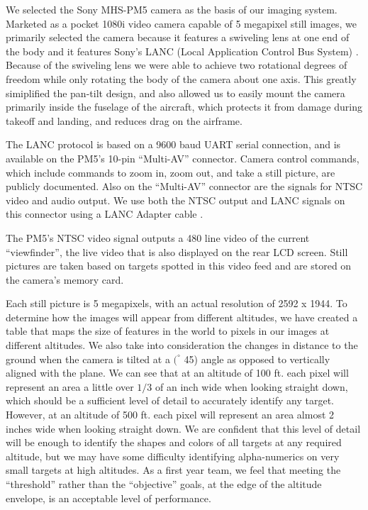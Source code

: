 \documentclass[10pt]{report}
\newcommand{\degrees}[1]
{
\begin{math}
#1^{\circ} 
\end{math}
}
\begin{document}
We selected the Sony MHS-PM5 camera as the basis of our imaging system. Marketed as a pocket 1080i video camera capable of 5 megapixel still images, we primarily selected the camera because it features a swiveling lens at one end of the body and it features Sony's LANC (Local Application Control Bus System) \cite{lanc}. Because of the swiveling lens we were able to achieve two rotational degrees of freedom while only rotating the body of the camera about one axis.  This greatly simiplified the pan-tilt design, and also allowed us to easily mount the camera primarily inside the fuselage of the aircraft, which protects it from damage during takeoff and landing, and reduces drag on the airframe. 

The LANC protocol is based on a 9600 baud UART serial connection, and is available on the PM5's 10-pin ``Multi-AV'' connector. Camera control commands, which include commands to zoom in, zoom out, and take a still picture, are publicly documented.  Also on the ``Multi-AV'' connector are the signals for NTSC video and audio output. We use both the NTSC output and LANC signals on this connector using a LANC Adapter cable \cite{lanc_adapter}.

The PM5's NTSC video signal outputs a 480 line video of the current ``viewfinder'', the live video that is also displayed on the rear LCD screen.  Still pictures are taken based on targets spotted in this video feed and are stored on the camera's memory card.

Each still picture is 5 megapixels, with an actual resolution of 2592 x 1944.  To determine how the images will appear from different altitudes, we have created a table that maps the size of features in the world to pixels in our images at different altitudes.  We also take into consideration the changes in distance to the ground when the camera is tilted at a \degrees(45) angle as opposed to vertically aligned with the plane.  We can see that at an altitude of 100 ft. each pixel will represent an area a little over $1/3$ of an inch wide when looking straight down, which should be a sufficient level of detail to accurately identify any target.  However, at an altitude of 500 ft. each pixel will represent an area almost 2 inches wide when looking straight down.  We are confident that this level of detail will be enough to identify the shapes and colors of all targets at any required altitude, but we may have some difficulty identifying alpha-numerics on very small targets at high altitudes.  As a first year team, we feel that meeting the ``threshold'' rather than the ``objective'' goals, at the edge of the altitude envelope, is an acceptable level of performance.
\end{document}
